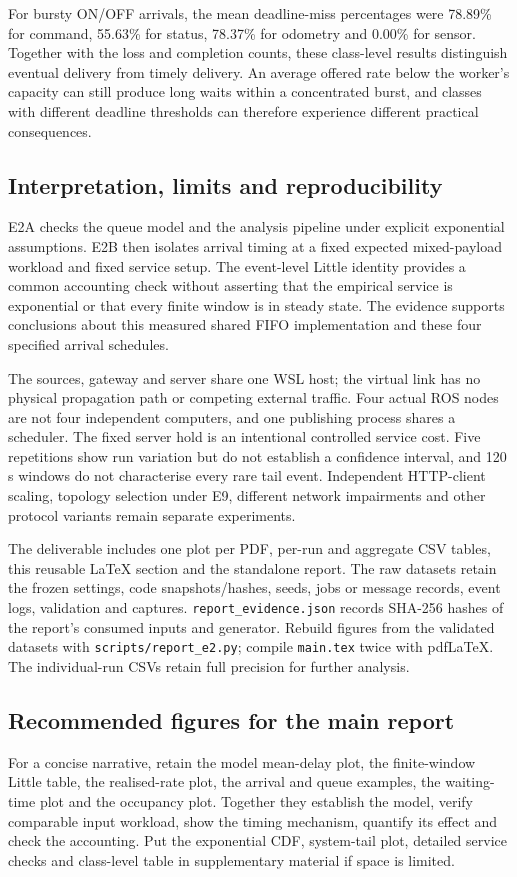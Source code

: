For bursty ON/OFF arrivals, the mean deadline-miss percentages were 78.89\% for command, 55.63\% for status, 78.37\% for odometry and 0.00\% for sensor. Together with the loss and completion counts, these class-level results distinguish eventual delivery from timely delivery. An average offered rate below the worker's capacity can still produce long waits within a concentrated burst, and classes with different deadline thresholds can therefore experience different practical consequences.

\subsection{Interpretation, limits and reproducibility}

E2A checks the queue model and the analysis pipeline under explicit exponential assumptions. E2B then isolates arrival timing at a fixed expected mixed-payload workload and fixed service setup. The event-level Little identity provides a common accounting check without asserting that the empirical service is exponential or that every finite window is in steady state. The evidence supports conclusions about this measured shared FIFO implementation and these four specified arrival schedules.

The sources, gateway and server share one WSL host; the virtual link has no physical propagation path or competing external traffic. Four actual ROS nodes are not four independent computers, and one publishing process shares a scheduler. The fixed server hold is an intentional controlled service cost. Five repetitions show run variation but do not establish a confidence interval, and 120 s windows do not characterise every rare tail event. Independent HTTP-client scaling, topology selection under E9, different network impairments and other protocol variants remain separate experiments.

The deliverable includes one plot per PDF, per-run and aggregate CSV tables, this reusable LaTeX section and the standalone report. The raw datasets retain the frozen settings, code snapshots/hashes, seeds, jobs or message records, event logs, validation and captures. \texttt{report\_evidence.json} records SHA-256 hashes of the report's consumed inputs and generator. Rebuild figures from the validated datasets with \texttt{scripts/report\_e2.py}; compile \texttt{main.tex} twice with pdfLaTeX. The individual-run CSVs retain full precision for further analysis.

\subsection{Recommended figures for the main report}

For a concise narrative, retain the model mean-delay plot, the finite-window Little table, the realised-rate plot, the arrival and queue examples, the waiting-time plot and the occupancy plot. Together they establish the model, verify comparable input workload, show the timing mechanism, quantify its effect and check the accounting. Put the exponential CDF, system-tail plot, detailed service checks and class-level table in supplementary material if space is limited.
